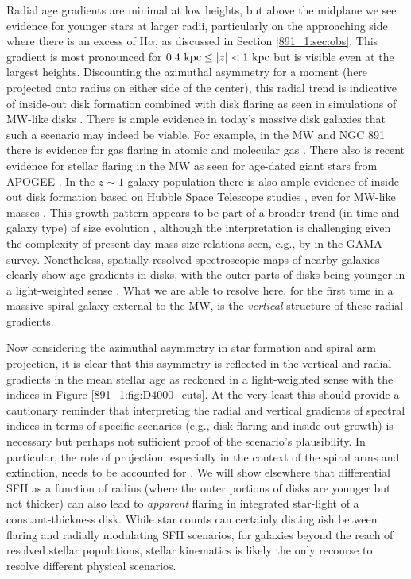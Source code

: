 Radial age gradients are minimal at low heights, but above the
midplane we see evidence for younger stars at larger radii,
particularly on the approaching side where there is an excess of
H$\alpha$, as discussed in Section \ref{891_1:sec:obs}. This gradient
is most pronounced for $0.4~\mathrm{kpc}  \leq |z| < 1~\mathrm{kpc} $ but is
visible even at the largest heights. Discounting the azimuthal
asymmetry for a moment (here projected onto radius on either side of
the center), this radial trend is indicative of inside-out disk
formation combined with disk flaring as seen in simulations of MW-like
disks \citep[e.g.,][]{Martig14a}. There is ample evidence in today's
massive disk galaxies that such a scenario may indeed be viable. For
example, in the MW and NGC 891 there is evidence for gas flaring in
atomic and molecular gas \citep[e.g.,][for NGC 891]{Scoville93,
  Yim11}. There also is recent evidence for stellar flaring in the MW
\citep{Ness16} as seen for age-dated giant stars from APOGEE
\citep{Majewski15}. In the $z\sim1$ galaxy population there is also
ample evidence of inside-out disk formation based on Hubble Space
Telescope studies \citep[e.g.,][]{Nelson15}, even for MW-like masses
\citep[e.g.,][]{vanDokkum13}. This growth pattern appears to be part
of a broader trend (in time and galaxy type) of size evolution
\citep[e.g.,][]{Shibuya15}, although the interpretation is challenging
given the complexity of present day mass-size relations seen, e.g., by
\citet{Lange15} in the GAMA survey.  Nonetheless, spatially resolved
spectroscopic maps of nearby galaxies clearly show age gradients in
disks, with the outer parts of disks being younger in a light-weighted
sense \citep{Sanchez-Blazquez14,Gonzalez-Delgado15}. What we are able
to resolve here, for the first time in a massive spiral galaxy
external to the MW, is the {\it vertical} structure of these radial
gradients.

Now considering the azimuthal asymmetry in star-formation and spiral
arm projection, it is clear that this asymmetry is reflected in the
vertical and radial gradients in the mean stellar age as reckoned in a
light-weighted sense with the indices in Figure
\ref{891_1:fig:D4000_cuts}.  At the very least this should provide a
cautionary reminder that interpreting the radial and vertical
gradients of spectral indices in terms of specific scenarios (e.g.,
disk flaring and inside-out growth) is necessary but perhaps not
sufficient proof of the scenario's plausibility. In particular, the
role of projection, especially in the context of the spiral arms and
extinction, needs to be accounted for \citep[cf the relative excess of
H$\alpha$ vs 24$\mu$ emission, as discussed in][]{Kamphuis07b}. We
will show elsewhere that differential SFH as a function of radius
(where the outer portions of disks are younger but not thicker) can
also lead to {\it apparent} flaring in integrated star-light of a
constant-thickness disk. While star counts can certainly distinguish
between flaring and radially modulating SFH scenarios, for galaxies
beyond the reach of resolved stellar populations, stellar kinematics
is likely the only recourse to resolve different physical scenarios.

